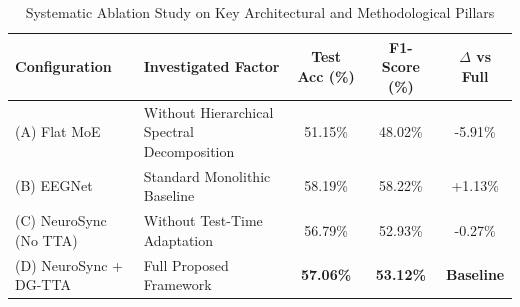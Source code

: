 \begin{table}[t]
\centering
\caption{Systematic Ablation Study on Key Architectural and Methodological Pillars}
\label{tab:ablation}
\begin{tabular}{llccc}
\hline
\textbf{Configuration} & \textbf{Investigated Factor} & \textbf{Test Acc (\%)} & \textbf{F1-Score (\%)} & $\Delta$ \textbf{vs Full} \\
\hline
(A) Flat MoE & Without Hierarchical Spectral Decomposition & 51.15\% & 48.02\% & -5.91\% \\
(B) EEGNet & Standard Monolithic Baseline & 58.19\% & 58.22\% & +1.13\% \\
(C) NeuroSync (No TTA) & Without Test-Time Adaptation & 56.79\% & 52.93\% & -0.27\% \\
(D) NeuroSync + DG-TTA & Full Proposed Framework & \textbf{57.06\%} & \textbf{53.12\%} & \textbf{Baseline} \\
\hline
\end{tabular}
\end{table}
